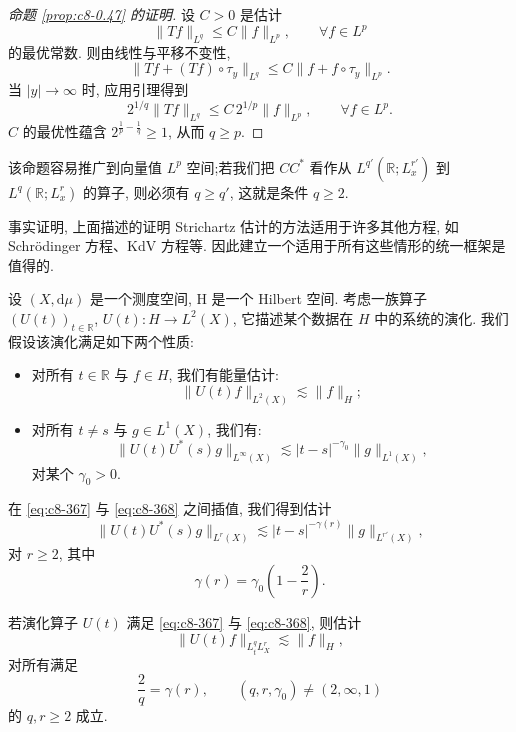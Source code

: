 \begin{proof}[命题 \ref{prop:c8-0.47} 的证明]
设 $C>0$ 是估计
\[
\|Tf\|_{L^q}\leq C\|f\|_{L^p}, \qquad \forall f\in L^p
\]
的最优常数. 则由线性与平移不变性, 
\[
\|Tf+(Tf)\circ\tau_y\|_{L^q}\leq C\|f+f\circ\tau_y\|_{L^p}.
\]
当 $|y|\to\infty$ 时, 应用引理得到
\[
2^{1/q}\|Tf\|_{L^q}\leq C\, 2^{1/p}\|f\|_{L^p}, \qquad \forall f\in L^p .
\]
$C$ 的最优性蕴含 $2^{\frac{1}{p}-\frac{1}{q}}\geq1$, 从而 $q\geq p$. 
\end{proof}

该命题容易推广到向量值 $L^p$ 空间;若我们把 $CC^{*}$ 看作从 $L^{q'}(\mathbb{R};L_x^{r'})$ 到 $L^q(\mathbb{R};L_x^r)$ 的算子, 则必须有 $q\geq q'$, 这就是条件 $q\geq2$. 

事实证明, 上面描述的证明 Strichartz 估计的方法适用于许多其他方程, 如 Schrödinger 方程、KdV 方程等. 因此建立一个适用于所有这些情形的统一框架是值得的. 

设 $(X, \mathrm{d}\mu)$ 是一个测度空间, H 是一个 Hilbert 空间. 考虑一族算子 $(U(t))_{t\in\mathbb{R}}$, $U(t):H\to L^2(X)$, 它描述某个数据在 $H$ 中的系统的演化. 我们假设该演化满足如下两个性质:

\begin{itemize}
\item 对所有 $t\in\mathbb{R}$ 与 $f\in H$, 我们有能量估计:
\begin{equation}
\|U(t)f\|_{L^2(X)}\lesssim\|f\|_H;\label{eq:c8-367}
\end{equation}
\item 对所有 $t\neq s$ 与 $g\in L^1(X)$, 我们有:
\begin{equation}
\bigl\|U(t)U^{*}(s)g\bigr\|_{L^\infty(X)}\lesssim|t-s|^{-\gamma_0}\|g\|_{L^1(X)}, \label{eq:c8-368}
\end{equation}
对某个 $\gamma_0>0$. 
\end{itemize}

在 \eqref{eq:c8-367} 与 \eqref{eq:c8-368} 之间插值, 我们得到估计
\begin{equation}
\bigl\|U(t)U^{*}(s)g\bigr\|_{L^r(X)}\lesssim|t-s|^{-\gamma(r)}\|g\|_{L^{r'}(X)}, \label{eq:c8-369}
\end{equation}
对 $r\geq2$, 其中
\[
\gamma(r)=\gamma_0\left(1-\frac{2}{r}\right).
\]

\begin{theorem}\label{thm:c8-0.50}
若演化算子 $U(t)$ 满足 \eqref{eq:c8-367} 与 \eqref{eq:c8-368}, 则估计
\begin{equation}
\|U(t)f\|_{L_t^q L_X^r}\lesssim\|f\|_H, \label{eq:c8-370}
\end{equation}
对所有满足
\begin{equation}
\frac{2}{q}=\gamma(r), \qquad (q, r, \gamma_0)\neq(2, \infty, 1)\label{eq:c8-371}
\end{equation}
的 $q, r\geq2$ 成立. 
\end{theorem}

